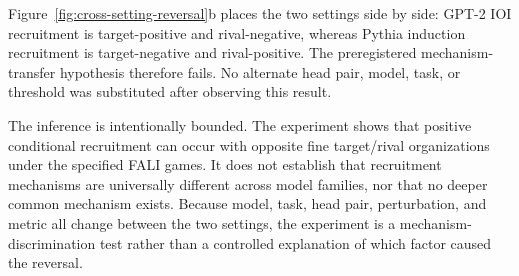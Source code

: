 Figure~\ref{fig:cross-setting-reversal}b places the two settings side by side: GPT-2 IOI recruitment is target-positive and rival-negative, whereas Pythia induction recruitment is target-negative and rival-positive. The preregistered mechanism-transfer hypothesis therefore fails. No alternate head pair, model, task, or threshold was substituted after observing this result.

The inference is intentionally bounded. The experiment shows that positive conditional recruitment can occur with opposite fine target/rival organizations under the specified FALI games. It does not establish that recruitment mechanisms are universally different across model families, nor that no deeper common mechanism exists. Because model, task, head pair, perturbation, and metric all change between the two settings, the experiment is a mechanism-discrimination test rather than a controlled explanation of which factor caused the reversal.



